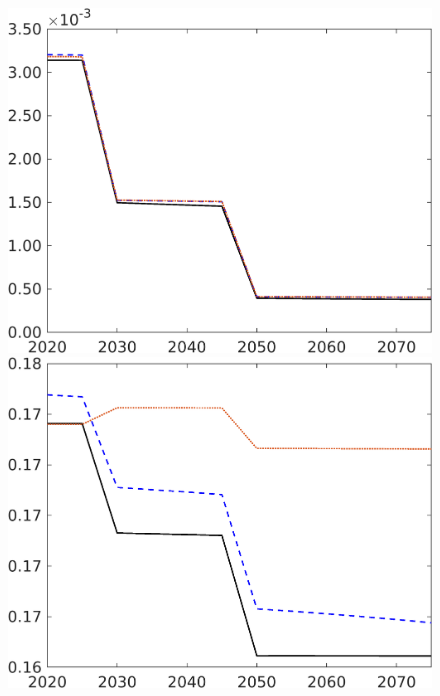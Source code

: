 \begin{figure}[h!!]
\begin{minipage}[]{0.32\textwidth}
		\includegraphics[width=1\textwidth]{../../codding_model/own_basedOnFried/optimalPol_elastS_DisuSci/figures/all_1705/Lf_CompEffOPT_T_NoTaus_spillover0_sep1_BN0_ineq0_red0_etaa0.79_lgd0.png}
	\end{minipage}
	\begin{minipage}[]{0.32\textwidth}
		\includegraphics[width=1\textwidth]{../../codding_model/own_basedOnFried/optimalPol_elastS_DisuSci/figures/all_1705/Ln_CompEffOPT_T_NoTaus_spillover0_sep1_BN0_ineq0_red0_etaa0.79_lgd0.png}
	\end{minipage}
\end{figure}
